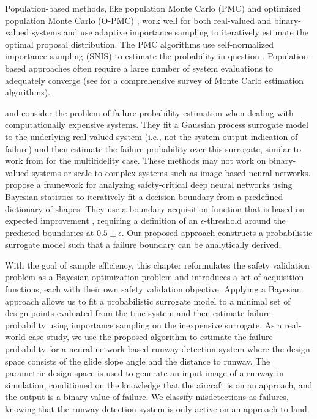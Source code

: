 Population-based methods, like population Monte Carlo (PMC) \cite{cappe2004population} and optimized population Monte Carlo (O-PMC) \cite{elvira2022optimized}, 
work well for both real-valued and binary-valued systems and use adaptive importance sampling \cite{bugallo2017adaptive} to iteratively estimate the optimal proposal distribution.
The PMC algorithms use self-normalized importance sampling (SNIS) to estimate the probability in question \cite{owen2013monte}.
Population-based approaches often require a large number of system evaluations to adequately converge (see \textcite{luengo2020survey} for a comprehensive survey of Monte Carlo estimation algorithms).

\textcite{vazquez2009sequential} and \textcite{wang2016gaussian} consider the problem of failure probability estimation when dealing with computationally expensive systems.
They fit a Gaussian process surrogate model to the underlying real-valued system (i.e., not the system output indication of failure) and then estimate the failure probability over this surrogate, similar to work from \textcite{renganathan2022multifidelity} for the multifidelity case.
These methods may not work on binary-valued systems or scale to complex systems such as image-based neural networks.
\textcite{he2020framework} propose a framework for analyzing safety-critical deep neural networks using Bayesian statistics to iteratively fit a decision boundary from a predefined dictionary of shapes.
They use a boundary acquisition function that is based on expected improvement \cite{ranjan2008sequential}, requiring a definition of an $\epsilon$-threshold around the predicted boundaries at $0.5 \pm \epsilon$.
Our proposed approach constructs a probabilistic surrogate model such that a failure boundary can be analytically derived.

With the goal of sample efficiency, this chapter reformulates the safety validation problem \cite{corso2021survey} as a Bayesian optimization problem \cite{mockus1989global,optbook,garnett2023bayesian} and introduces a set of acquisition functions, each with their own safety validation objective.
Applying a Bayesian approach allows us to fit a probabilistic surrogate model to a minimal set of design points evaluated from the true system and then estimate failure probability using importance sampling on the inexpensive surrogate.
As a real-world case study, we use the proposed algorithm to estimate the failure probability for a neural network-based runway detection system where the design space consists of the glide slope angle and the distance to runway.
The parametric design space is used to generate an input image of a runway in simulation, conditioned on the knowledge that the aircraft is on an approach, and the output is a binary value of failure.
We classify misdetections as failures, knowing that the runway detection system is only active on an approach to land.

